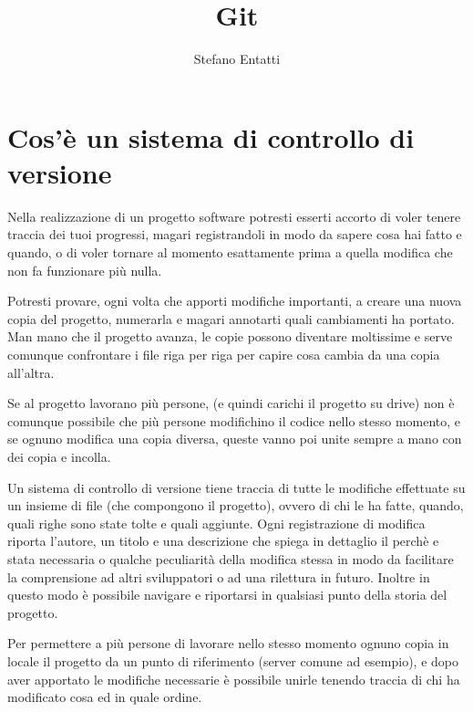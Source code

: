 \documentclass{article}
\title{Git}
\date{\vspace{-5ex}}
\author{Stefano Entatti}
\begin{document}
\maketitle

\newcommand{\code}[1]{\texttt{#1}}
\newcommand{\links}[1]{{\color{blue}\underline{#1}}}

\newcommand{\link}[2]{\href{#1}{\links{#2}}}
\newcommand{\reff}[1]{\links{\ref{#1}}}

\section{Cos'è un sistema di controllo di versione}
Nella realizzazione di un progetto software potresti esserti accorto di voler
tenere traccia dei tuoi progressi, magari registrandoli in modo da sapere cosa
hai fatto e quando, o di voler tornare al momento esattamente prima a quella
modifica che non fa funzionare più nulla.

Potresti provare, ogni volta che apporti modifiche importanti, a creare una
nuova copia del progetto, numerarla e magari annotarti quali cambiamenti ha
portato. Man mano che il progetto avanza, le copie possono diventare moltissime
e serve comunque confrontare i file riga per riga per capire cosa cambia da una
copia all'altra.

Se al progetto lavorano più persone, (e quindi carichi il progetto su drive) non
è comunque possibile che più persone modifichino il codice nello stesso momento,
e se ognuno modifica una copia diversa, queste vanno poi unite sempre a mano con
dei copia e incolla.

Un sistema di controllo di versione tiene traccia di tutte le modifiche
effettuate su un insieme di file (che compongono il progetto), ovvero di chi le
ha fatte, quando, quali righe sono state tolte e quali aggiunte. Ogni registrazione
di modifica riporta l'autore, un titolo e una descrizione che spiega in dettaglio
il perchè e stata necessaria o qualche peculiarità della modifica stessa
in modo da facilitare la comprensione ad altri sviluppatori o ad una rilettura
in futuro. Inoltre in questo modo è possibile navigare e riportarsi in 
qualsiasi punto della storia del progetto.

Per permettere a più persone di lavorare nello stesso momento ognuno
copia in locale il progetto da un punto di riferimento (server comune ad
esempio), e dopo aver apportato le modifiche necessarie è possibile unirle 
tenendo traccia di chi ha modificato cosa ed in quale ordine.
\end{document}
